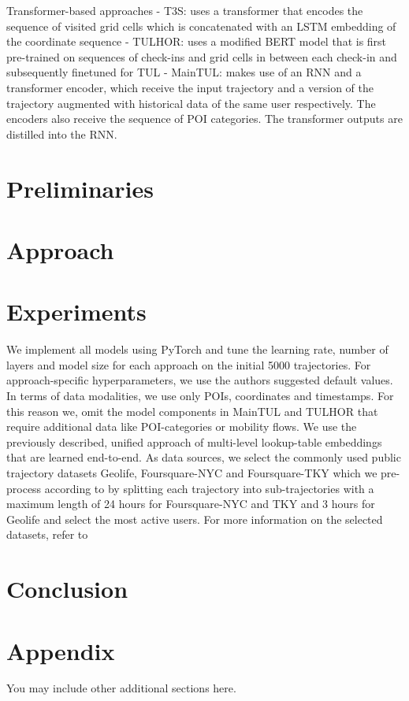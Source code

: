 \documentclass{article} %
\begin{document}
Transformer-based approaches
- T3S: uses a transformer that encodes the sequence of visited grid cells which is concatenated with an LSTM embedding of the coordinate sequence
- TULHOR: uses a modified BERT model that is first pre-trained on sequences of check-ins and grid cells in between each check-in and subsequently finetuned for TUL
- MainTUL: makes use of an RNN and a transformer encoder, which receive the input trajectory and a version of the trajectory augmented with historical data of the same user respectively. The encoders also receive the sequence of POI categories. The transformer outputs are distilled into the RNN.



\section{Preliminaries}

\section{Approach}

\section{Experiments}

We implement all models using PyTorch and tune the learning rate, number of layers and model size for each approach on the initial 5000 trajectories. For approach-specific hyperparameters, we use the authors suggested default values. 
In terms of data modalities, we use only POIs, coordinates and timestamps. 
For this reason we, omit the model components in MainTUL and TULHOR that require additional data like POI-categories or mobility flows. 
We use the previously described, unified approach of multi-level lookup-table embeddings that are learned end-to-end. 
As data sources, we select the commonly used public trajectory datasets Geolife, Foursquare-NYC and Foursquare-TKY which we pre-process according to \textcite{chenMutualDistillationLearning2022a} by splitting each trajectory into sub-trajectories with a maximum length of 24 hours for Foursquare-NYC and TKY and 3 hours for Geolife and select the most active users.
For more information on the selected datasets, refer to %






\section{Conclusion}






\appendix
\section{Appendix}
You may include other additional sections here.
\end{document}
